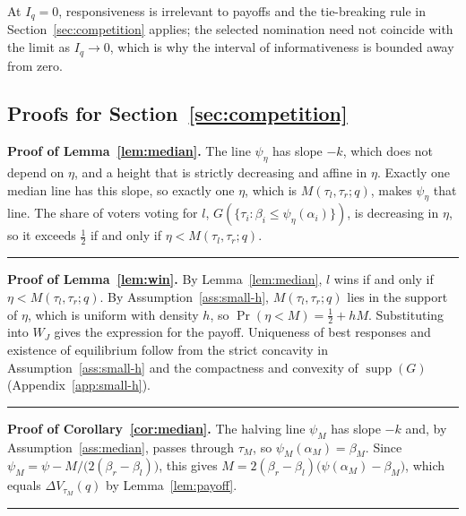 \documentclass[12pt,letterpaper]{article}
\newenvironment{proof}[1][Proof]{\noindent\textbf{#1.} }{\ \rule{0.5em}{0.5em}}
\begin{document}
At $I_q=0$, responsiveness is irrelevant to payoffs and the tie-breaking rule in Section~\ref{sec:competition} applies; the selected nomination need not coincide with the limit as $I_q\to0$, which is why the interval of informativeness is bounded away from zero.

\subsection*{Proofs for Section~\ref{sec:competition}}

\begin{proof}[Proof of Lemma~\ref{lem:median}]
The line $\psi_\eta$ has slope $-k$, which does not depend on $\eta$, and a height that is strictly decreasing and affine in $\eta$. Exactly one median line has this slope, so exactly one $\eta$, which is $M(\tau_l,\tau_r;q)$, makes $\psi_\eta$ that line. The share of voters voting for $l$, $G(\{\tau_i:\beta_i\le\psi_\eta(\alpha_i)\})$, is decreasing in $\eta$, so it exceeds $\tfrac12$ if and only if $\eta<M(\tau_l,\tau_r;q)$.
\end{proof}

\begin{proof}[Proof of Lemma~\ref{lem:win}]
By Lemma~\ref{lem:median}, $l$ wins if and only if $\eta<M(\tau_l,\tau_r;q)$. By Assumption~\ref{ass:small-h}, $M(\tau_l,\tau_r;q)$ lies in the support of $\eta$, which is uniform with density $h$, so $\Pr(\eta<M)=\tfrac12+hM$. Substituting into $W_J$ gives the expression for the payoff. Uniqueness of best responses and existence of equilibrium follow from the strict concavity in Assumption~\ref{ass:small-h} and the compactness and convexity of $\operatorname{supp}(G)$ (Appendix~\ref{app:small-h}).
\end{proof}

\begin{proof}[Proof of Corollary~\ref{cor:median}]
The halving line $\psi_M$ has slope $-k$ and, by Assumption~\ref{ass:median}, passes through $\tau_M$, so $\psi_M(\alpha_M)=\beta_M$. Since $\psi_M=\psi-M/\big(2(\beta_r-\beta_l)\big)$, this gives $M=2(\beta_r-\beta_l)\big(\psi(\alpha_M)-\beta_M\big)$, which equals $\Delta V_{\tau_M}(q)$ by Lemma~\ref{lem:payoff}.
\end{proof}
\end{document}

